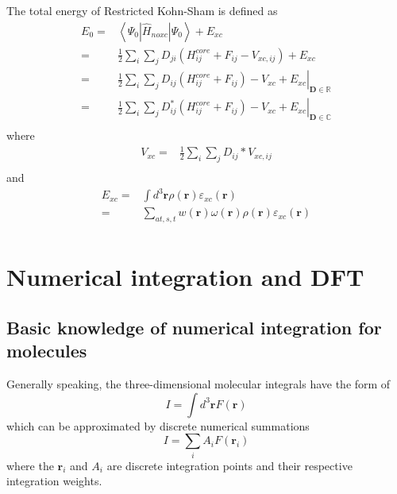 \documentclass[a4paper,12pt]{article}
\begin{document}
The total energy of Restricted Kohn-Sham is defined as
\begin{equation}
	\begin{split}
		E_0 =&\left<\Psi_0\left|\hat{H}_{noxc}\right|\Psi_0\right>+E_{xc}\\
		=&\frac{1}{2}\sum_{i}\sum_{j}D_{ji}\left( H_{ij}^{core}+F_{ij}-V_{xc,ij} \right)+E_{xc}\\
		=&\left.\frac{1}{2}\sum_{i}\sum_{j}D_{ij}\left( H_{ij}^{core}+F_{ij} \right)-V_{xc}+E_{xc}\right|_{\textbf{D}\in\mathbb{R}}\\
		=&\left.\frac{1}{2}\sum_{i}\sum_{j}D_{ij}^{*}\left( H_{ij}^{core}+F_{ij}\right)-V_{xc}+E_{xc}\right|_{\textbf{D}\in\mathbb{C}}\\
	\end{split}
\end{equation}
where 
\begin{equation}
	\begin{split}
		V_{xc} = &\frac{1}{2}\sum_{i}\sum_{j}D_{ij}*V_{xc,ij}\\
	\end{split}
\end{equation}
and
\begin{equation}
	\begin{split}
		E_{xc} = &\int d^3\textbf{r}\rho(\textbf{r})\varepsilon_{xc}(\textbf{r})\\
		= &\sum_{at,s,t}w(\textbf{r})\omega(\textbf{r})\rho(\textbf{r})\varepsilon_{xc}(\textbf{r})\\
	\end{split}
\end{equation}



\section{Numerical integration and DFT}
\subsection{Basic knowledge of numerical integration for molecules}
Generally speaking, the three-dimensional molecular integrals have the form of
\begin{equation}
	I = \int d^3\textbf{r} F(\textbf{r})
\end{equation}
which can be approximated by discrete numerical summations
\begin{equation}
	I = \sum_i A_i F(\textbf{r}_i)
\end{equation}
where the $\textbf{r}_i$ and $A_i$ are discrete integration points and their respective integration weights.
\end{document}
